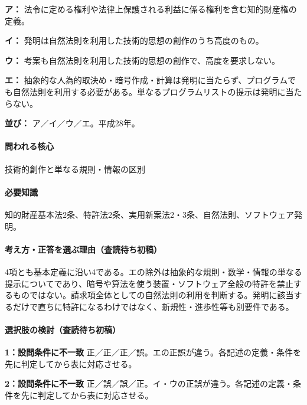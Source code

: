 \noindent\textbf{ア：} 法令に定める権利や法律上保護される利益に係る権利を含む知的財産権の定義。\par

\noindent\textbf{イ：} 発明は自然法則を利用した技術的思想の創作のうち高度のもの。\par

\noindent\textbf{ウ：} 考案も自然法則を利用した技術的思想の創作で、高度を要求しない。\par

\noindent\textbf{エ：} 抽象的な人為的取決め・暗号作成・計算は発明に当たらず、プログラムでも自然法則を利用する必要がある。単なるプログラムリストの提示は発明に当たらない。\par

\noindent\textbf{並び：} ア／イ／ウ／エ。平成28年。\par

\paragraph{問われる核心} 技術的創作と単なる規則・情報の区別

\paragraph{必要知識} 知的財産基本法2条、特許法2条、実用新案法2・3条、自然法則、ソフトウェア発明。

\paragraph{考え方・正答を選ぶ理由（査読待ち初稿）} 4項とも基本定義に沿い4である。エの除外は抽象的な規則・数学・情報の単なる提示についてであり、暗号や算法を使う装置・ソフトウェア全般の特許を禁止するものではない。請求項全体としての自然法則の利用を判断する。発明に該当するだけで直ちに特許になるわけではなく、新規性・進歩性等も別要件である。

\paragraph{選択肢の検討（査読待ち初稿）}\mbox{}\par

\noindent\textbf{1：設問条件に不一致} 正／正／正／誤。エの正誤が違う。各記述の定義・条件を先に判定してから表に対応させる。\par

\noindent\textbf{2：設問条件に不一致} 正／誤／誤／正。イ・ウの正誤が違う。各記述の定義・条件を先に判定してから表に対応させる。\par

